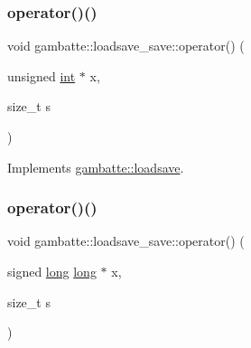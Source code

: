\subsubsection{\texorpdfstring{operator()()}{operator()()}\hspace{0.1cm}{\footnotesize\ttfamily [15/19]}}
{\footnotesize\ttfamily void gambatte\+::loadsave\+\_\+save\+::operator() (\begin{DoxyParamCaption}\item[{unsigned \hyperlink{ioapi_8h_a787fa3cf048117ba7123753c1e74fcd6}{int} $\ast$}]{x,  }\item[{size\+\_\+t}]{s }\end{DoxyParamCaption})\hspace{0.3cm}{\ttfamily [virtual]}}



Implements \hyperlink{classgambatte_1_1loadsave_a0985be7f430a1626e2b0f47066e9a8b6}{gambatte\+::loadsave}.

\mbox{\label{classgambatte_1_1loadsave__save_a728994d21679b1d7d5bbc916701c1125}} 
\subsubsection{\texorpdfstring{operator()()}{operator()()}\hspace{0.1cm}{\footnotesize\ttfamily [16/19]}}
{\footnotesize\ttfamily void gambatte\+::loadsave\+\_\+save\+::operator() (\begin{DoxyParamCaption}\item[{signed \hyperlink{ioapi_8h_a3c7b35ad9dab18b8310343c201f7b27e}{long} \hyperlink{ioapi_8h_a3c7b35ad9dab18b8310343c201f7b27e}{long} $\ast$}]{x,  }\item[{size\+\_\+t}]{s }\end{DoxyParamCaption})}

\mbox{\label{classgambatte_1_1loadsave__save_a54522867610dbbbb57932a862914646b}} 
